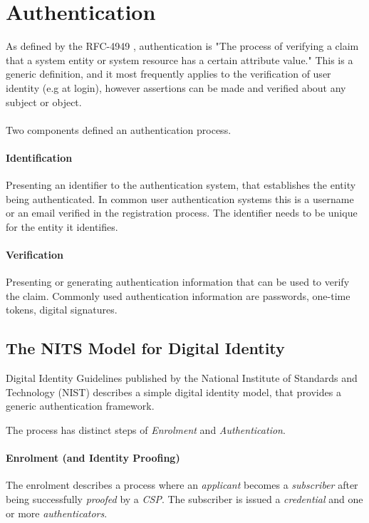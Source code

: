 \section{Authentication}

As defined by the RFC-4949 \cite{shirey2007internet}, authentication is "The process of verifying a claim that a system entity or system resource has a certain attribute value."
This is a generic definition, and it most frequently applies to the verification of user identity (e.g at login), however assertions can be made and verified about any subject or object.
\\
\\
Two components defined an authentication process. %
\paragraph{Identification} Presenting an identifier to the authentication system, that establishes the entity being authenticated.
In common user authentication systems this is a username or an email verified in the registration process. 
The identifier needs to be unique for the entity it identifies.

\paragraph{Verification} Presenting or generating authentication information that can be used to verify the claim.
Commonly used authentication information are passwords, one-time tokens, digital signatures.

\subsection{The NITS Model for Digital Identity}

Digital Identity Guidelines \cite{grassi2017} published by the National Institute of Standards and Technology (NIST) describes a simple digital identity model, that provides a generic authentication framework.

The process has distinct steps of \textit{Enrolment} and \textit{Authentication}.

\paragraph{Enrolment (and Identity Proofing)}

The enrolment describes a process where an \textit{applicant} becomes a \textit{subscriber} after being successfully \textit{proofed} by a \textit{CSP}.
The subscriber is issued a \textit{credential} and one or more \textit{authenticators}.


